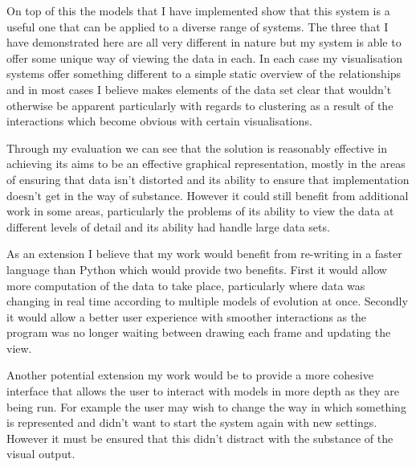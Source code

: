 \documentclass[12pt,a4paper]{article}
\begin{document}
On top of this the models that I have implemented show that this system is a useful one that can be applied to a diverse range of systems. The three that I have demonstrated here are all very different in nature but my system is able to offer some unique way of viewing the data in each. In each case my visualisation systems offer something different to a simple static overview of the relationships and in most cases I believe makes elements of the data set clear that wouldn't otherwise be apparent particularly with regards to clustering as a result of the interactions which become obvious with certain visualisations.

Through my evaluation we can see that the solution is reasonably effective in achieving its aims to be an effective graphical representation, mostly in the areas of ensuring that data isn't distorted and its ability to ensure that implementation doesn't get in the way of substance. However it could still benefit from additional work in some areas, particularly the problems of its ability to view the data at different levels of detail and its ability had handle large data sets. 

As an extension I believe that my work would benefit from re-writing in a faster language than Python which would provide two benefits. First it would allow more computation of the data to take place, particularly where data was changing in real time according to multiple models of evolution at once. Secondly it would allow a better user experience with smoother interactions as the program was no longer waiting between drawing each frame and updating the view.

Another potential extension my work would be to provide a more cohesive interface that allows the user to interact with models in more depth as they are being run. For example the user may wish to change the way in which something is represented and didn't want to start the system again with new settings. However it must be ensured that this didn't distract with the substance of the visual output.


\end{document}
